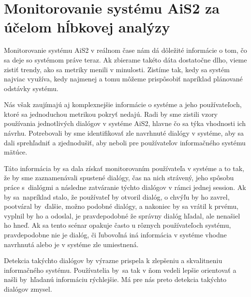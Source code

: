 \documentclass[a4paper, upjsfrontpage, disablespecwarning, thesismargins, thesislinespacing]{rnthesis}
\begin{document}


\section{Monitorovanie systému AiS2 za účelom hĺbkovej analýzy}

Monitorovanie systému AiS2 v reálnom čase nám dá dôležité informácie o tom, čo sa deje so systémom práve teraz.
Ak zbierame takéto dáta dostatočne dlho, vieme zistiť trendy, ako sa metriky menili v minulosti.
Zistíme tak, kedy sa systém najviac využíva, kedy najmenej a tomu môžeme prispôsobiť napríklad plánované odstávky systému.

Nás však zaujímajú aj komplexnejšie informácie o systéme a jeho používateľoch, ktoré sa jednoduchou metrikou pokryť nedajú.
Radi by sme zistili vzory používania jednotlivých dialógov v systéme AiS2, hlavne čo sa týka vhodnosti ich návrhu.
Potrebovali by sme identifikovať zle navrhnuté dialógy v systéme, aby sa dali sprehľadniť a zjednodušiť, aby neboli pre používateľov informačného systému mätúce.

Táto informácia by sa dala získať monitorovaním používateľa v systéme a to tak, že by sme zaznamenávali spustené dialógy, čas na nich strávený, jeho spôsobu práce s~dialógmi a následne zatváranie týchto dialógov v rámci jednej session.
Ak by sa~napríklad stalo, že používateľ by otvoril dialóg, o chvýľu by ho zavrel, pootváral by~ďalšie, možno podobné dialógy, a nakoniec by sa vrátil k prvému, vyplnil by ho a odoslal, je pravdepodobné že správny dialóg hľadal, ale nenašiel ho hneď.
Ak sa tento scénar opakuje často u rôznych používateľoch systému, pravdepodobne nie je dialóg, či ľubovoľná iná informácia v systéme vhodne navrhnutá alebo je v systéme zle umiestnená.

Detekcia takýchto dialógov by výrazne prispela k zlepšeniu a skvalitneniu informačného systému.
Používatelia by~sa tak v ňom vedeli lepšie orientovať a našli by~hľadanú informáciu rýchlejšie.
Má pre nás preto detekcia takýchto dialógov zmysel.
\end{document}
